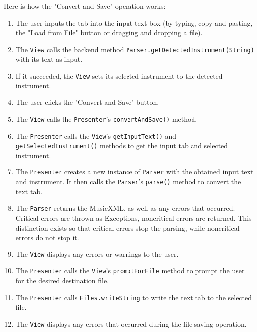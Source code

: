 \documentclass[11pt]{article}
\begin{document}
Here is how the "Convert and Save" operation works:
\begin{enumerate}
\item The user inputs the tab into the input text box (by typing, copy-and-pasting, the "Load from File" button or dragging and dropping a file).
\item The \texttt{View} calls the backend method \texttt{Parser.getDetectedInstrument(String)} with its text as input.
\item If it succeeded, the \texttt{View} sets its selected instrument to the detected instrument.
\item The user clicks the "Convert and Save" button.
\item The \texttt{View} calls the \texttt{Presenter}'s \texttt{convertAndSave()} method.
\item The \texttt{Presenter} calls the \texttt{View}'s \texttt{getInputText()} and \texttt{getSelectedInstrument()} methods to get the input tab and selected instrument.
\item The \texttt{Presenter} creates a new instance of \texttt{Parser} with the obtained input text and instrument.  It then calls the \texttt{Parser}'s \texttt{parse()} method to convert the text tab.
\item The \texttt{Parser} returns the MusicXML, as well as any errors that occurred.  Critical errors are thrown as Exceptions, noncritical errors are returned.  This distinction exists so that critical errors stop the parsing, while noncritical errors do not stop it.
\item The \texttt{View} displays any errors or warnings to the user.
\item The \texttt{Presenter} calls the \texttt{View}'s \texttt{promptForFile} method to prompt the user for the desired destination file.
\item The \texttt{Presenter} calls \texttt{Files.writeString} to write the text tab to the selected file.
\item The \texttt{View} displays any errors that occurred during the file-saving operation.
\end{enumerate}
\end{document}
